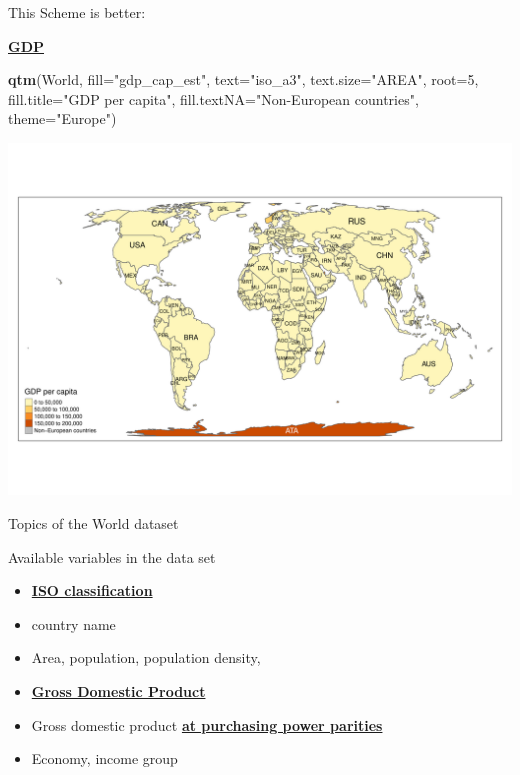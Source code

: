 \documentclass[
  ignorenonframetext,
]{beamer}
\newenvironment{Shaded}{\begin{snugshade}}{\end{snugshade}}
\newcommand{\DataTypeTok}[1]{\textcolor[rgb]{0.13,0.29,0.53}{#1}}
\newcommand{\DecValTok}[1]{\textcolor[rgb]{0.00,0.00,0.81}{#1}}
\newcommand{\KeywordTok}[1]{\textcolor[rgb]{0.13,0.29,0.53}{\textbf{#1}}}
\newcommand{\NormalTok}[1]{#1}
\newcommand{\StringTok}[1]{\textcolor[rgb]{0.31,0.60,0.02}{#1}}
\providecommand{\tightlist}{%
  \setlength{\itemsep}{0pt}\setlength{\parskip}{0pt}}
\begin{document}
\begin{frame}[fragile]{This Scheme is better:}
\protect\hypertarget{this-scheme-is-better}{}
\begin{block}{\href{https://en.wikipedia.org/wiki/Population_density}{\textbf{GDP}}}
\protect\hypertarget{gdp}{}
\begin{Shaded}
\begin{Highlighting}[]
\KeywordTok{qtm}\NormalTok{(World, }\DataTypeTok{fill=}\StringTok{"gdp\_cap\_est"}\NormalTok{, }\DataTypeTok{text=}\StringTok{"iso\_a3"}\NormalTok{, }
    \DataTypeTok{text.size=}\StringTok{"AREA"}\NormalTok{, }\DataTypeTok{root=}\DecValTok{5}\NormalTok{, }\DataTypeTok{fill.title=}\StringTok{"GDP per capita"}\NormalTok{, }
    \DataTypeTok{fill.textNA=}\StringTok{"Non{-}European countries"}\NormalTok{, }\DataTypeTok{theme=}\StringTok{"Europe"}\NormalTok{)}
\end{Highlighting}
\end{Shaded}

\includegraphics{quick_high_quality_maps_files/figure-beamer/unnamed-chunk-6-1.pdf}
\end{block}
\end{frame}

\begin{frame}{Topics of the World dataset}
\protect\hypertarget{topics-of-the-world-dataset}{}
\begin{block}{Available variables in the data set}
\protect\hypertarget{available-variables-in-the-data-set}{}
\begin{itemize}
\tightlist
\item
  \href{http://userpage.chemie.fu-berlin.de/diverse/doc/ISO_3166.html}{\textbf{ISO
  classification}}
\item
  country name
\item
  Area, population, population density,
\item
  \href{https://en.wikipedia.org/wiki/Gross_domestic_product}{\textbf{Gross
  Domestic Product}}
\item
  Gross domestic product
  \href{https://en.wikipedia.org/wiki/List_of_countries_by_GDP_\%28PPP\%29_per_capita}{\textbf{at
  purchasing power parities}}
\item
  Economy, income group
\end{itemize}
\end{block}
\end{frame}
\end{document}
